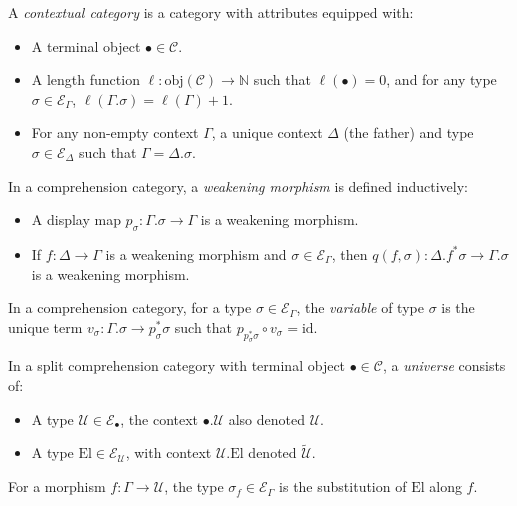 \documentclass{article}
\begin{document}
\begin{definition}
A \emph{contextual category} is a category with attributes equipped with:
\begin{itemize}
    \item A terminal object \(\bullet \in \mathcal{C}\).
    \item A length function \(\ell : \mathrm{obj}(\mathcal{C}) \to \mathbb{N}\) such that \(\ell(\bullet) = 0\), and for any type \(\sigma \in \mathcal{E}_\Gamma\), \(\ell(\Gamma.\sigma) = \ell(\Gamma) + 1\).
    \item For any non-empty context \(\Gamma\), a unique context \(\Delta\) (the father) and type \(\sigma \in \mathcal{E}_\Delta\) such that \(\Gamma = \Delta.\sigma\).
\end{itemize}
\end{definition}

\begin{definition}
In a comprehension category, a \emph{weakening morphism} is defined inductively:
\begin{itemize}
    \item A display map \(p_\sigma : \Gamma.\sigma \to \Gamma\) is a weakening morphism.
    \item If \(f : \Delta \to \Gamma\) is a weakening morphism and \(\sigma \in \mathcal{E}_\Gamma\), then \(q(f, \sigma) : \Delta.f^*\sigma \to \Gamma.\sigma\) is a weakening morphism.
\end{itemize}
\end{definition}

\begin{definition}[Variable]
In a comprehension category, for a type \(\sigma \in \mathcal{E}_\Gamma\), the \emph{variable} of type \(\sigma\) is the unique term \(v_\sigma : \Gamma.\sigma \to p_\sigma^* \sigma\) such that \(p_{p_\sigma^* \sigma} \circ v_\sigma = \mathrm{id}\).
\end{definition}

\begin{definition}[Universe]
In a split comprehension category with terminal object \(\bullet \in \mathcal{C}\), a \emph{universe} consists of:
\begin{itemize}
    \item A type \(\mathcal{U} \in \mathcal{E}_\bullet\), the context \(\bullet.\mathcal{U}\) also denoted \(\mathcal{U}\).
    \item A type \(\mathrm{El} \in \mathcal{E}_{\mathcal{U}}\), with context \(\mathcal{U}.\mathrm{El}\) denoted \(\widetilde{\mathcal{U}}\).
\end{itemize}
For a morphism \(f : \Gamma \to \mathcal{U}\), the type \(\sigma_f \in \mathcal{E}_\Gamma\) is the substitution of \(\mathrm{El}\) along \(f\).
\end{definition}
\end{document}
